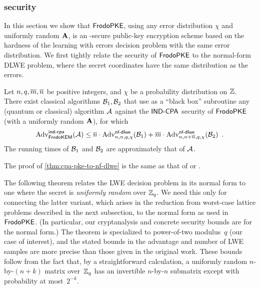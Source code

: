 \subsubsection{\INDCPA security}\label{sec:strength:cpa-pke}

In this section we show that $\textsf{\upshape\mdseries FrodoPKE}$, using any error distribution
$\chi$ and uniformly random $\mathbf{A}$, is an \INDCPA-secure public-key
encryption scheme based on the hardness of the learning with errors
decision problem with the same error distribution. We first tightly
relate the \INDCPA security of $\textsf{\upshape\mdseries FrodoPKE}$ to the normal-form DLWE
problem, where the secret coordinates have the same distribution as
the errors.

\begin{theorem}
  \label{thm:cpa-pke-to-nf-dlwe}
  Let $n, q, \overline{m}, \overline{n}$ be positive integers, and $\chi$ be a
  probability distribution on $\mathbb{Z}$. There exist classical algorithms
  $\mathcal{B}_{1}, \mathcal{B}_{2}$ that use as a ``black box''
  subroutine any (quantum or classical) algorithm $\mathcal{A}$ against
  the $\textsf{\upshape\mdseries IND-CPA}$ security of $\textsf{\upshape\mdseries FrodoPKE}$ (with a uniformly random
  $\mathbf{A}$), for which
  \[ \mathrm{Adv}^{\textsf{\upshape\mdseries \textsf{\upshape\mdseries ind-cpa}}}_{\textsf{\upshape\mdseries FrodoKEM}}(\mathcal{A}) \leq \overline{n} \cdot
    \mathrm{Adv}^{\textsf{\upshape\mdseries \textsf{\upshape\mdseries nf-dlwe}}}_{n,n,q,\chi}(\mathcal{B}_1) + \overline{m} \cdot
    \mathrm{Adv}^{\textsf{\upshape\mdseries \textsf{\upshape\mdseries nf-dlwe}}}_{n,n+\overline{n},q,\chi}(\mathcal{B}_2) \enspace . \] The
  running times of $\mathcal{B}_1$ and $\mathcal{B}_2$ are approximately
  that of $\mathcal{A}$.
\end{theorem}
The proof of \autoref{thm:cpa-pke-to-nf-dlwe} is the same as that of
\cite[Theorem~3.2]{RSA:LinPei11} or \cite[Theorem~5.1]{CCS:BCDMNN16}.

The following theorem relates the LWE decision problem in its normal
form to one where the secret is \emph{uniformly random} over
$\mathbb{Z}_{q}$. We need this only for connecting the latter variant, which
arises in the reduction from worst-case lattice problems described in
the next subsection, to the normal form as used in $\textsf{\upshape\mdseries FrodoPKE}$. (In
particular, our cryptanalysis and concrete security bounds are for the
normal form.) The theorem is specialized to power-of-two modulus~$q$
(our case of interest), and the stated bounds in the advantage and
number of LWE samples are more precise than those given in the
original work. These bounds follow from the fact that, by a
straightforward calculation, a uniformly random $n$-by-$(n+k)$ matrix
over~$\mathbb{Z}_{q}$ has an invertible $n$-by-$n$ submatrix except with
probability at most~$2^{-k}$.

